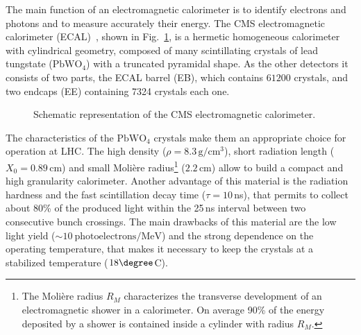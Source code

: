 The main function of an electromagnetic calorimeter is to identify electrons and photons and to measure accurately their energy. The CMS electromagnetic calorimeter (ECAL)~\cite{ecal,Bloch:581342}, shown in Fig.~\ref{fig:ecal}, is a hermetic homogeneous calorimeter with cylindrical geometry, composed of many scintillating crystals of lead tungstate ($\mathrm{PbWO_4}$) with a truncated pyramidal shape. As the other detectors it consists of two parts, the ECAL barrel (EB), which contains $61200$ crystals, and two endcaps (EE) containing 7324 crystals each one.

\begin{figure}[htb]
\centering
{}
\caption{Schematic representation of the CMS electromagnetic calorimeter.}\label{fig:ecal}
\end{figure}

The characteristics of the $\mathrm{PbWO_4}$ crystals make them an appropriate choice for operation at LHC. The high density ($\rho=8.3\,\mathrm{g/cm^3}$), short radiation length ($X_0 = 0.89\,\mathrm{cm}$) and small Moli\`ere radius\footnote{The Moli\`ere radius $R_M$ characterizes the transverse development of an electromagnetic shower in a calorimeter. On average 90\% of the energy deposited by a shower is contained inside a cylinder with radius $R_M$.} ($2.2$\,cm) allow to build a compact and high granularity calorimeter. Another advantage of this material is the radiation hardness and the fast scintillation decay time ($\tau = 10$\,ns), that permits to collect about 80\% of the produced light within the 25\,ns interval between two consecutive bunch crossings. The main drawbacks of this material are the low light yield ($\sim 10~\mathrm{photoelectrons/MeV}$) and the strong dependence on the operating temperature, that makes it necessary to keep the crystals at a stabilized temperature ($18\degree$C).

